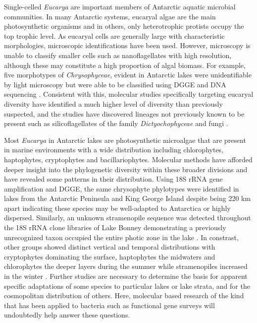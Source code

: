 Single-celled \emph{Eucarya} are important members of Antarctic aquatic microbial communities.
In many Antarctic systems, eucaryal algae are the main photosynthetic organisms and in others, only heterotrophic protists occupy the top trophic level. 
As eucaryal cells are generally large with characteristic morphologies, microscopic identifications have been used. 
However, microscopy is unable to classify smaller cells such as nanoflagellates with high resolution, although these may constitute a high proportion of algal biomass.
For example, five morphotypes of \emph{Chrysophyceae}, evident in Antarctic lakes were unidentifiable by light microscopy but were able to be classified using \ac{DGGE} and \textsc{DNA} sequencing \cite{Unrein2005}.
Consistent with this, molecular studies specifically targeting eucaryal diversity \cite{Unrein2005, Mosier2007, Bielewicz2011} have identified a much higher level of diversity than previously suspected,
 and the studies have discovered lineages not previously known to be present such as silicoflagellates of the family \emph{Dictyochophyceae} \cite{Unrein2005} and fungi \cite{Mosier2007, Bielewicz2011}.

Most \emph{Eucarya} in Antarctic lakes are photosynthetic microalgae that are present in marine environments with a wide distribution including chlorophytes, haptophytes, cryptophytes and bacillariophytes.
Molecular methods have afforded deeper insight into the phylogenetic diversity within these broader divisions and have revealed some patterns in their distribution. 
Using 18S \ac{rRNA} gene amplification and \ac{DGGE}, the same chrysophyte phylotypes were identified in lakes from the Antarctic Peninsula and King George Island 
despite being 220 km apart \cite{Unrein2005} indicating these species may be well-adapted to Antarctica or highly dispersed.
Similarly, an unknown stramenopile sequence was detected throughout the 18S \ac{rRNA} clone libraries of Lake Bonney 
demonstrating a previously unrecognized taxon occupied the entire photic zone in the lake \cite{Bielewicz2011}. 
In constrast, other groups showed distinct vertical and temporal distributions with cryptophytes dominating the surface, 
haptophytes the midwaters and chlorophytes the deeper layers during the summer while stramenopiles increased in the winter \cite{Bielewicz2011}. 
Further studies are necessary to determine the basis for apparent specific adaptations of some species to particular lakes or lake strata, and for the cosmopolitan distribution of others.
Here, molecular based research of the kind that has been applied to bacteria such as functional gene surveys will undoubtedly help answer these questions.

